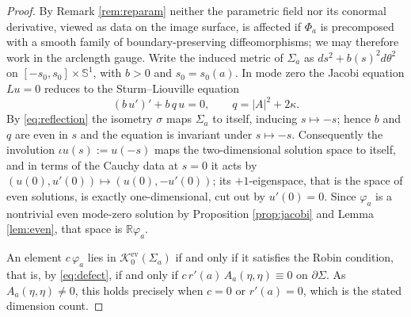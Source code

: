 \documentclass[10pt,a4paper]{amsart}
\newcommand{\R}{\mathbb{R}}
\newcommand{\Sph}{\mathbb{S}}
\newcommand{\Ker}{\mathcal{K}}
\begin{document}
\begin{proof}
By Remark \ref{rem:reparam} neither the parametric field nor its conormal derivative, viewed as data on the image surface, is affected if $\Phi_a$ is precomposed with a smooth family of boundary-preserving diffeomorphisms; we may therefore work in the arclength gauge. Write the induced metric of $\Sigma_a$ as $ds^2+b(s)^2d\theta^2$ on $[-s_0,s_0]\times\Sph^1$, with $b>0$ and $s_0=s_0(a)$. In mode zero the Jacobi equation $Lu=0$ reduces to the Sturm--Liouville equation
\[
(b\,u')'+b\,q\,u=0,\qquad q=|A|^2+2\kappa .
\]
By \eqref{eq:reflection} the isometry $\sigma$ maps $\Sigma_a$ to itself, inducing $s\mapsto-s$; hence $b$ and $q$ are even in $s$ and the equation is invariant under $s\mapsto-s$. Consequently the involution $\iota u(s):=u(-s)$ maps the two-dimensional solution space to itself, and in terms of the Cauchy data at $s=0$ it acts by $(u(0),u'(0))\mapsto(u(0),-u'(0))$; its $+1$-eigenspace, that is the space of even solutions, is exactly one-dimensional, cut out by $u'(0)=0$. Since $\varphi_a$ is a nontrivial even mode-zero solution by Proposition \ref{prop:jacobi} and Lemma \ref{lem:even}, that space is $\R\varphi_a$.

An element $c\,\varphi_a$ lies in $\Ker_0^{\mathrm{ev}}(\Sigma_a)$ if and only if it satisfies the Robin condition, that is, by \eqref{eq:defect}, if and only if $c\,r'(a)\,A_a(\eta,\eta)\equiv 0$ on $\partial\Sigma$. As $A_a(\eta,\eta)\neq 0$, this holds precisely when $c=0$ or $r'(a)=0$, which is the stated dimension count.
\end{proof}
\end{document}
